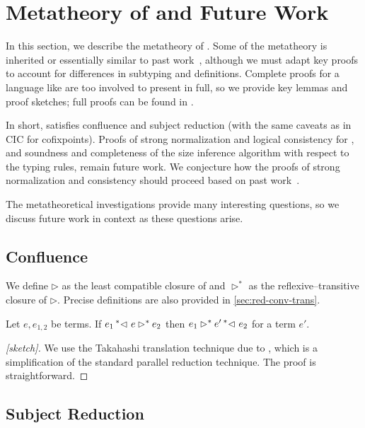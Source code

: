 \section{Metatheory of \titlelang and Future Work}
\label{sec:metatheory}

In this section, we describe the metatheory of \lang.
Some of the metatheory is inherited or essentially similar to past work~\citep{cic-hat-minus,cc-hat-omega,cic-hat}, although we must adapt key proofs to account for differences in subtyping and definitions.
Complete proofs for a language like \lang are too involved to present in full, so we provide key lemmas and proof sketches; full proofs can be found in \anotherpdf.

In short, \lang satisfies confluence and subject reduction (with the same caveats as in CIC for cofixpoints).
Proofs of strong normalization and logical consistency for \lang, and soundness and completeness of the size inference algorithm with respect to the typing rules, remain future work.
We conjecture how the proofs of strong normalization and consistency should proceed based on past work~\citep{cic-hat-minus,cc-hat-omega,cic-hat}.

The metatheoretical investigations provide many interesting questions, so we discuss future work in context as these questions arise.

\subsection{Confluence}

We define $\rhd$ as the least compatible closure of \reduction and $\rhd^*$ as the reflexive--transitive closure of $\rhd$. Precise definitions are also provided in \autoref{sec:red-conv-trans}.

\begin{theorem}[Confluence]
\label{thm:metatheory:confluence}
  Let $e, e_{1,2}$ be terms.
  If $e_1 \prescript{*}{}{\lhd ~ } e \rhd^* e_2$ then
  $e_1 \rhd^* e' \prescript{*}{}{\lhd ~ } e_2$
  for a term $e'$.
\end{theorem}
%
\begin{proof}[{[sketch]}]
  We use the Takahashi translation technique due to \citet{takahashitrans}, which is a simplification of the standard
  parallel reduction technique.
  The proof is straightforward.
\end{proof}

\subsection{Subject Reduction}
\label{sec:meta:sub-red}

